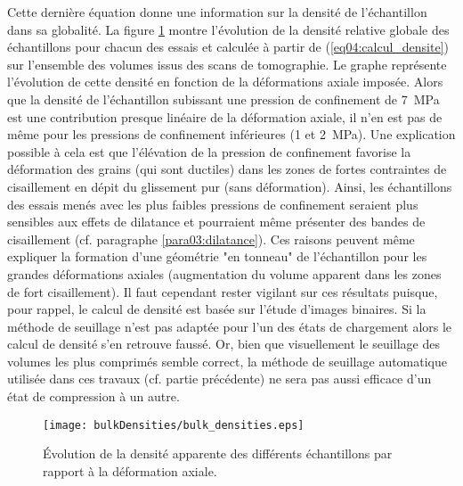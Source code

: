 		Cette dernière équation donne une information sur la densité de l'échantillon dans sa globalité. La figure \ref{fig04:bulkDensities} montre l'évolution de la densité relative globale des échantillons pour chacun des essais et calculée à partir de (\ref{eq04:calcul_densite}) sur l'ensemble des volumes issus des scans de tomographie. Le graphe représente l'évolution de cette densité en fonction de la déformations axiale imposée. Alors que la densité de l'échantillon subissant une pression de confinement de \SI{7}{\mega\pascal} est une contribution presque linéaire de la déformation axiale, il n'en est pas de même pour les pressions de confinement inférieures (\num{1} et \SI{2}{\mega\pascal}). Une explication possible à cela \citep{pavier_caracterisation_1998} est que l'élévation de la pression de confinement favorise la déformation des grains (qui sont ductiles) dans les zones de fortes contraintes de cisaillement en dépit du glissement pur (sans déformation). Ainsi, les échantillons des essais menés avec les plus faibles pressions de confinement seraient plus sensibles aux effets de dilatance et pourraient même présenter des bandes de cisaillement (cf. paragraphe \ref{para03:dilatance}). Ces raisons peuvent même expliquer la formation d'une géométrie "en tonneau" de l'échantillon pour les grandes déformations axiales (augmentation du volume apparent dans les zones de fort cisaillement). Il faut cependant rester vigilant sur ces résultats puisque, pour rappel, le calcul de densité est basée sur l'étude d'images binaires. Si la méthode de seuillage n'est pas adaptée pour l'un des états de chargement alors le calcul de densité s'en retrouve faussé. Or, bien que visuellement le seuillage des volumes les plus comprimés semble correct, la méthode de seuillage automatique utilisée dans ces travaux (cf. partie précédente) ne sera pas aussi efficace d'un état de compression à un autre.
		\begin{figure}\centering
			\texttt{[image: bulkDensities/bulk\_densities.eps]}
			\caption{\label{fig04:bulkDensities}\'Evolution de la densité apparente des différents échantillons par rapport à la déformation axiale.}
		\end{figure}
